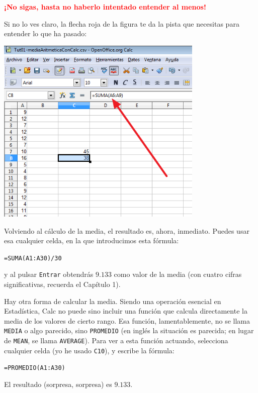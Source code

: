\documentclass[10pt,a4paper]{article}\usepackage[]{graphicx}\usepackage[]{color}
\begin{document}
\vspace{3cm}
\begin{center}
  \textcolor{red}{\Large\bf ¡No sigas, hasta no haberlo intentado entender al menos!}
\end{center}
\newpage


Si no lo ves claro, la flecha roja de la figura te da la pista que necesitas para entender lo que ha pasado:
    \begin{center}
    \includegraphics[height=9cm]{../fig/Tut01-Calc-Formula-18.png}
    \end{center}

Volviendo al cálculo de la media, el resultado es, ahora, inmediato. Puedes usar esa cualquier celda, en la que introducimos esta fórmula:
\begin{center}
{\tt =SUMA(A1:A30)/30}
\end{center}
y al pulsar {\tt Entrar} obtendrás $9.133$ como valor de la media (con cuatro cifras significativas, recuerda el Capítulo 1).

Hay otra forma de calcular la media. Siendo una operación esencial en Estadística, Calc no puede sino incluir una función que calcula directamente la media de los valores de cierto rango. Esa función, lamentablemente, no se llama {\tt MEDIA} o algo parecido, sino {\tt PROMEDIO} (en inglés la situación es parecida; en lugar de {\tt MEAN}, se llama {\tt AVERAGE}). Para ver a esta función actuando, selecciona cualquier celda (yo he usado {\tt C10}), y escribe la fórmula:
\begin{center}
{\tt =PROMEDIO(A1:A30)}
\end{center}
El resultado (sorpresa, sorpresa) es $9.133$.
\end{document}
